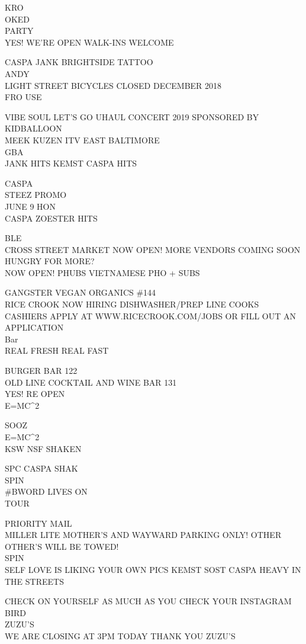 \documentclass[10pt,letterpaper]{article}
\begin{document}
KRO\\
OKED\\
PARTY\\
YES!  WE'RE OPEN WALK{-}INS WELCOME

CASPA JANK BRIGHTSIDE TATTOO\\
ANDY\\
LIGHT STREET BICYCLES CLOSED DECEMBER 2018\\
FRO USE

VIBE SOUL LET'S GO UHAUL CONCERT 2019 SPONSORED BY KIDBALLOON\\
MEEK KUZEN ITV EAST BALTIMORE\\
GBA\\
JANK HITS KEMST CASPA HITS

CASPA\\
STEEZ PROMO\\
JUNE 9 HON\\
CASPA ZOESTER HITS

BLE\\
CROSS STREET MARKET NOW OPEN!  MORE VENDORS COMING SOON\\
HUNGRY FOR MORE?\\
NOW OPEN!  PHUBS VIETNAMESE PHO + SUBS

GANGSTER VEGAN ORGANICS \#144\\
RICE CROOK NOW HIRING DISHWASHER/PREP LINE COOKS CASHIERS APPLY AT WWW.RICECROOK.COM/JOBS OR FILL OUT AN APPLICATION\\
Bar\\
REAL FRESH REAL FAST

BURGER BAR 122\\
OLD LINE COCKTAIL AND WINE BAR 131\\
YES!  RE OPEN\\
E=MC\^{}2

SOOZ\\
E=MC\^{}2\\
KSW NSF SHAKEN

SPC CASPA SHAK\\
SPIN\\
\#BWORD LIVES ON\\
TOUR

PRIORITY MAIL\\
MILLER LITE MOTHER'S AND WAYWARD PARKING ONLY!  OTHER OTHER'S WILL BE TOWED!\\
SPIN\\
SELF LOVE IS LIKING YOUR OWN PICS KEMST SOST CASPA HEAVY IN THE STREETS

CHECK ON YOURSELF AS MUCH AS YOU CHECK YOUR INSTAGRAM\\
BIRD\\
ZUZU'S\\
WE ARE CLOSING AT 3PM TODAY THANK YOU ZUZU'S
\end{document}
